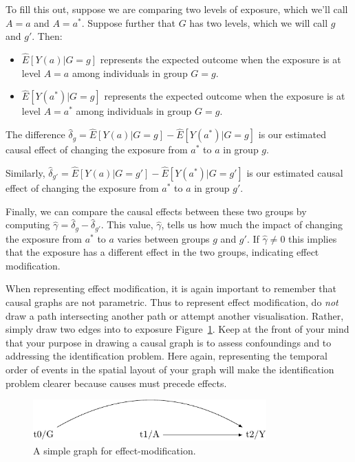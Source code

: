 \documentclass[
  singlecolumn]{report}
\begin{document}
To fill this out, suppose we are comparing two levels of exposure, which
we'll call \(A = a\) and \(A= a^*\). Suppose further that \(G\) has two
levels, which we will call \(g\) and \(g'\). Then:

\begin{itemize}
\item
  \(\hat{E}[Y(a)|G=g]\) represents the expected outcome when the
  exposure is at level \(A=a\) among individuals in group \(G=g\).
\item
  \(\hat{E}[Y(a^*)|G=g]\) represents the expected outcome when the
  exposure is at level \(A=a^*\) among individuals in group \(G=g\).
\end{itemize}

The difference
\(\hat{\delta}_g = \hat{E}[Y(a)|G=g] - \hat{E}[Y(a^*)|G=g]\) is our
estimated causal effect of changing the exposure from \(a^*\) to \(a\)
in group \(g\).

Similarly,
\(\hat{\delta}_{g'} = \hat{E}[Y(a)|G=g'] - \hat{E}[Y(a^*)|G=g']\) is our
estimated causal effect of changing the exposure from \(a^*\) to \(a\)
in group \(g'\).

Finally, we can compare the causal effects between these two groups by
computing \(\hat{\gamma} = \hat{\delta}_g - \hat{\delta}_{g'}\). This
value, \(\hat{\gamma}\), tells us how much the impact of changing the
exposure from \(a^*\) to \(a\) varies between groups \(g\) and \(g'\).
If \(\hat{\gamma}\neq 0\) this implies that the exposure has a different
effect in the two groups, indicating effect modification.

When representing effect modification, it is again important to remember
that causal graphs are not parametric. Thus to represent effect
modification, do \emph{not} draw a path intersecting another path or
attempt another visualisation. Rather, simply draw two edges into to
exposure Figure~\ref{fig-dag-effect-modfication}. Keep at the front of
your mind that your purpose in drawing a causal graph is to assess
confoundings and to addressing the identification problem. Here again,
representing the temporal order of events in the spatial layout of your
graph will make the identification problem clearer because causes must
precede effects.

\begin{figure}

{\centering \includegraphics[width=0.8\textwidth,height=\textheight]{causal-dags_files/figure-pdf/fig-dag-effect-modfication-1.pdf}

}

\caption{\label{fig-dag-effect-modfication}A simple graph for
effect-modification.}

\end{figure}
\end{document}
